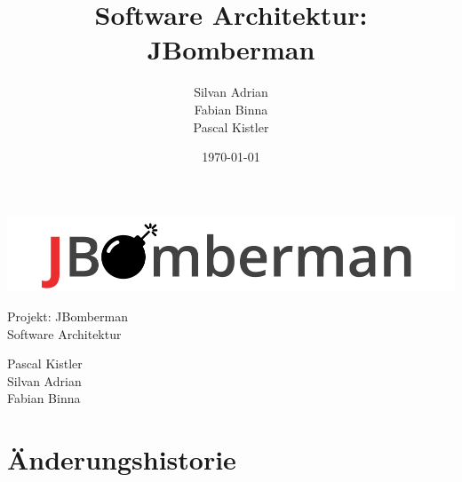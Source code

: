 \documentclass[11pt]{scrartcl}
\title{Software Architektur: JBomberman}
\author{Silvan Adrian \\ Fabian Binna \\ Pascal Kistler}
\date{\today{}}
\begin{document}
\def\arraystretch{1.5}
\begin{titlepage}
\begin{center}
\vspace{10em}
\includegraphics[scale=2]{jbomberman}
\vspace{10em}
\end{center}
\begin{center}
\huge {Projekt: JBomberman} \\
\huge {Software Architektur}
\end{center}
\begin{center}
\vspace{10em}
\LARGE {Pascal Kistler} \\
\LARGE {Silvan Adrian} \\
\LARGE {Fabian Binna}
\end{center}

\end{titlepage}

\newpage
\section{Änderungshistorie}
\label{sec:Änderungen}
\end{document}
